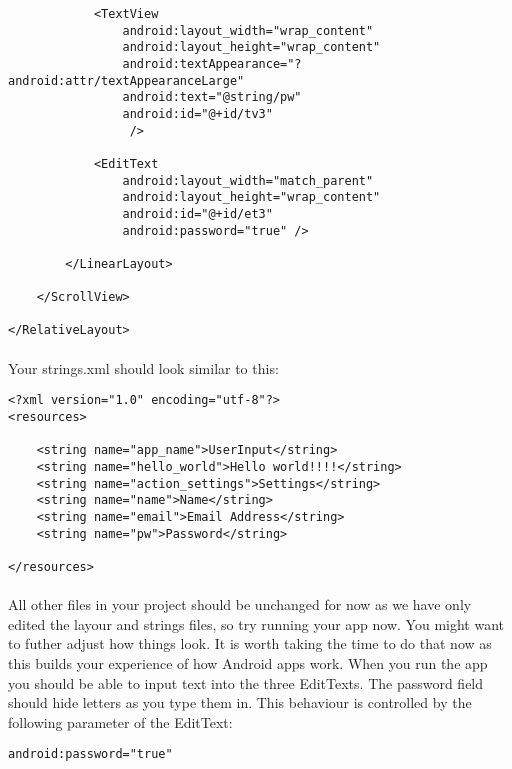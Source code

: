 \begin{lstlisting}
            <TextView
                android:layout_width="wrap_content"
                android:layout_height="wrap_content"
                android:textAppearance="?android:attr/textAppearanceLarge"
                android:text="@string/pw"
                android:id="@+id/tv3"
                 />

            <EditText
                android:layout_width="match_parent"
                android:layout_height="wrap_content"
                android:id="@+id/et3"
                android:password="true" />

        </LinearLayout>

    </ScrollView>

</RelativeLayout>

\end{lstlisting}

\paragraph{} Your strings.xml should look similar to this:

\begin{lstlisting}
<?xml version="1.0" encoding="utf-8"?>
<resources>

    <string name="app_name">UserInput</string>
    <string name="hello_world">Hello world!!!!</string>
    <string name="action_settings">Settings</string>
    <string name="name">Name</string>
    <string name="email">Email Address</string>
    <string name="pw">Password</string>

</resources>
\end{lstlisting}

\paragraph{} All other files in your project should be unchanged for now as we have only edited the layour and strings files, so try running your app now. You might want to futher adjust how things look. It is worth taking the time to do that now as this builds your experience of how Android apps work. When you run the app you should be able to input text into the three EditTexts. The password field should hide letters as you type them in. This behaviour is controlled by the following parameter of the EditText: 

\begin{lstlisting}
android:password="true"
\end{lstlisting}

